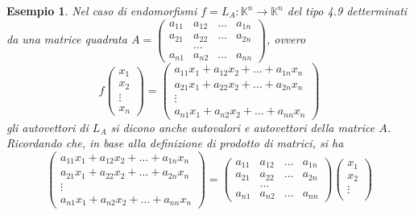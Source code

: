\documentclass{book}
\newtheorem{esempio}{Esempio}[section]
\begin{document}
\begin{esempio}
  \label{es:5.1.2}
  Nel caso di endomorfismi $f=L_A:\mathds{K}^n\to \mathds{K}^n$ del tipo 4.9  detterminati da una matrice quadrata
  $A=
  \begin{pmatrix}
    a_{11} & a_{12} & \dots &a_{1n}\\
    a_{21} & a_{22} & \dots & a_{2n}\\
           & \dots\\
    a_{n1} & a_{n2} & \dots & a_{nn}
  \end{pmatrix}
  $, ovvero
  \begin{equation}
    \label{eq:5.2}
    f
    \begin{pmatrix}
      x_1\\
      x_2\\
      \vdots\\
      x_n
    \end{pmatrix}=
    \begin{pmatrix}
      a_{11}x_1+a_{12}x_2+\dots+a_{1n}x_n\\ 
      a_{21}x_1+a_{22}x_2+\dots+a_{2n}x_n\\
      \vdots\\ 
      a_{n1}x_1+a_{n2}x_2+\dots+a_{nn}x_n
    \end{pmatrix}
  \end{equation}
  gli autovettori di $L_A$ si dicono anche autovalori e autovettori della matrice $A$. Ricordando che, in base
  alla definizione di prodotto di matrici, si ha
  \begin{equation}
    \label{eq:5.3}
     \begin{pmatrix}
      a_{11}x_1+a_{12}x_2+\dots+a_{1n}x_n\\ 
      a_{21}x_1+a_{22}x_2+\dots+a_{2n}x_n\\
      \vdots\\ 
      a_{n1}x_1+a_{n2}x_2+\dots+a_{nn}x_n
    \end{pmatrix}=
   \begin{pmatrix}
    a_{11} & a_{12} & \dots &a_{1n}\\
    a_{21} & a_{22} & \dots & a_{2n}\\
           & \dots\\
    a_{n1} & a_{n2} & \dots & a_{nn}
  \end{pmatrix}
  \begin{pmatrix}
      x_1\\
      x_2\\
      \vdots\\

\end{pmatrix}
\end{equation}
\end{esempio}
\end{document}
